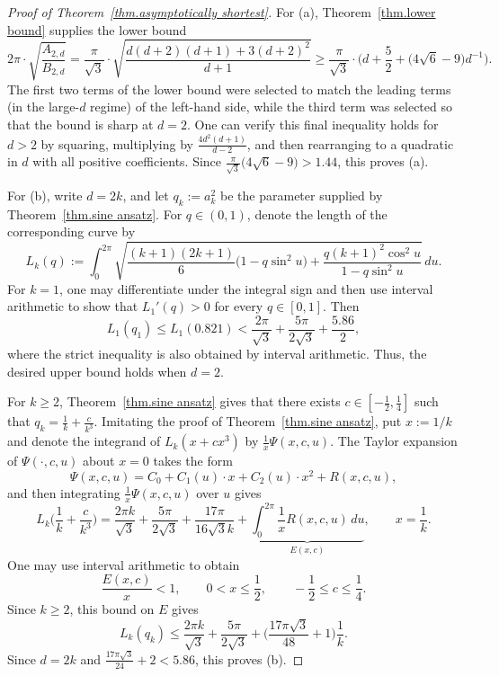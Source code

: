\documentclass[12pt]{article}
\theoremstyle{plain}
\theoremstyle{definition}
\theoremstyle{remark}
\begin{document}
\begin{proof}[Proof of Theorem~\ref{thm.asymptotically shortest}]
For (a), Theorem~\ref{thm.lower bound} supplies the lower bound
\[
2\pi\cdot\sqrt{\frac{A_{2,d}}{B_{2,d}}}
=
\frac{\pi}{\sqrt{3}}\cdot
\sqrt{\frac{d(d+2)(d+1)+3(d+2)^2}{d+1}}
\geq
\frac{\pi}{\sqrt{3}}\cdot\bigg(
d+\frac52+\big(4\sqrt6-9\big)d^{-1}\bigg).
\]
The first two terms of the lower bound were selected to match the leading terms (in the large-$d$ regime) of the left-hand side, while the third term was selected so that the bound is sharp at $d=2$.
One can verify this final inequality holds for $d>2$ by squaring, multiplying by $\frac{4d^2(d+1)}{d-2}$, and then rearranging to a quadratic in $d$ with all positive coefficients.
Since $\frac{\pi}{\sqrt{3}}\big(4\sqrt6-9\big)>1.44$,
this proves (a).


For (b), write $d=2k$, and let $q_k:=a_k^2$ be the parameter supplied by Theorem~\ref{thm.sine ansatz}.  
For $q\in(0,1)$, denote the length of the corresponding curve by
\[
L_k(q)
:=
\int_0^{2\pi}
\sqrt{
\frac{(k+1)(2k+1)}{6}\big(1-q\sin^2u\big)
+\frac{q(k+1)^2\cos^2u}{1-q\sin^2u}
}\,du.
\]
For $k=1$, one may differentiate under the integral sign and then use interval arithmetic to show that $L_1'(q)>0$ for every $q\in[0,1]$.
Then
\[
L_1(q_1)
\leq L_1(0.821)
<\frac{2\pi}{\sqrt3}
+\frac{5\pi}{2\sqrt3}
+\frac{5.86}{2},
\]
where the strict inequality is also obtained by interval arithmetic.
Thus, the desired upper bound holds when $d=2$.

For $k\geq2$, Theorem~\ref{thm.sine ansatz} gives that there exists $c\in[-\frac{1}{2},\frac{1}{4}]$ such that $q_k=\frac1k+\frac{c}{k^3}$.
Imitating the proof of Theorem~\ref{thm.sine ansatz}, put $x:=1/k$ and denote the integrand of $L_k(x+cx^3)$ by $\frac{1}{x}\Psi(x,c,u)$.
The Taylor expansion of $\Psi(\cdot,c,u)$ about $x=0$ takes the form
\[
\Psi(x,c,u)
=C_0 + C_1(u)\cdot x + C_2(u)\cdot x^2+R(x,c,u),
\]
and then integrating $\frac{1}{x}\Psi(x,c,u)$ over $u$ gives
\[
L_k\bigg(\frac1k+\frac{c}{k^3}\bigg)
=
\frac{2\pi k}{\sqrt3}
+\frac{5\pi}{2\sqrt3}
+
\frac{17\pi}{16\sqrt{3}k}
+
\underbrace{\int_0^{2\pi}\frac{1}{x}
R(x,c,u)
\,du}_{E(x,c)},
\qquad x=\frac{1}{k}.
\]
One may use interval arithmetic to obtain
\[
\frac{E(x,c)}{x}<1,
\qquad
0< x\leq\frac12,
\qquad
-\frac12\leq c\leq\frac14.
\]
Since $k\geq2$, this bound on $E$ gives
\[
L_k(q_k)
\leq
\frac{2\pi k}{\sqrt3}
+\frac{5\pi}{2\sqrt3}
+
\bigg(
\frac{17\pi\sqrt3}{48}+1
\bigg)\frac1k.
\]
Since $d=2k$ and $\frac{17\pi\sqrt3}{24}+2<5.86$, this proves (b).
\end{proof}
\end{document}
